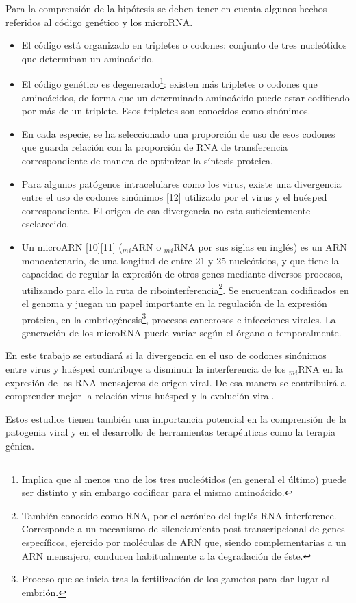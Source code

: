 \documentclass[12pt,a4paper]{article}
\begin{document}
\par Para la comprensión de la hipótesis se deben tener en cuenta algunos hechos referidos al código genético y los microRNA.
\begin{itemize}
	\item El código está organizado en tripletes o codones: conjunto de tres nucleótidos que determinan un aminoácido.
	\item El código genético es degenerado\footnote{Implica que al menos uno de los tres nucleótidos (en general el último) puede ser distinto y sin 				embargo codificar para el mismo aminoácido.}: existen más tripletes o codones que aminoácidos, de forma que un determinado aminoácido puede 				estar codificado por más de un triplete. Esos tripletes son conocidos como sinónimos. 
	\item En cada especie, se ha seleccionado una proporción de uso de esos codones que guarda relación con la proporción de RNA de transferencia  				correspondiente de manera de optimizar la síntesis proteica.
	\item Para algunos patógenos intracelulares como los virus, existe una divergencia entre el uso de codones sinónimos [12] utilizado por el virus y el 			huésped	correspondiente. El origen de esa divergencia no esta suficientemente esclarecido.
	\item Un microARN [10][11] ($_m$$_i$ARN o $_m$$_i$RNA por sus siglas en inglés) es un ARN monocatenario, de una longitud de entre 21 y 25 nucleótidos, 							y que tiene la capacidad de regular la expresión de otros genes mediante diversos procesos, utilizando para ello la ruta de 						ribointerferencia\footnote{También conocido como RNA$_i$ por el acrónico del inglés RNA interference. Corresponde a un mecanismo 							de silenciamiento post-transcripcional de genes específicos, ejercido por moléculas de ARN que, siendo complementarias a un ARN 						mensajero, conducen habitualmente a la degradación de éste.}. Se encuentran codificados en el genoma y juegan un papel importante 							en la regulación de la expresión proteica, en la embriogénesis\footnote{Proceso que se inicia tras la fertilización de los gametos 							para dar lugar al embrión.}, procesos cancerosos e infecciones virales. La generación de los microRNA puede variar según el 						órgano o temporalmente. 
\end{itemize}

\par En este trabajo se estudiará si la divergencia en el uso de codones sinónimos entre virus y huésped contribuye a disminuir la interferencia de los $_m$$_i$RNA en la expresión de los  RNA mensajeros de origen viral. De esa manera se contribuirá a comprender mejor la relación virus-huésped y la evolución viral.
\par Estos estudios tienen también una importancia potencial en la comprensión de la patogenia viral y en el desarrollo de herramientas terapéuticas como la terapia génica.
\end{document}
